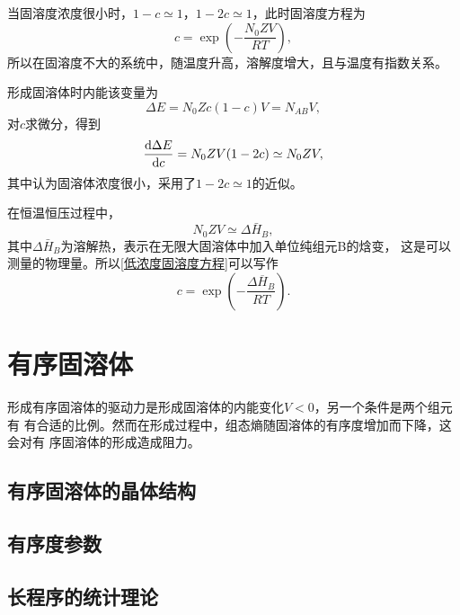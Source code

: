             当固溶度浓度很小时，$1-c\simeq 1$，$1-2c\simeq 1$，此时固溶度方程为
            \begin{equation}
                c=\exp \left(-\frac{N_{0} Z V}{R T}\right)\label{低浓度固溶度方程},
            \end{equation}
            所以在固溶度不大的系统中，随温度升高，溶解度增大，且与温度有指数关系。

            形成固溶体时内能该变量为
            \begin{equation}
                \Delta E=N_0Zc(1-c)V=N_{AB}V,
            \end{equation}
            对$c$求微分，得到
            \begin{equation}
                \frac{\mathop{}\!\mathrm{d} \Delta E}{\mathop{}\!\mathrm{d} c}=N_0ZV(1-2c)\simeq N_0ZV,
            \end{equation}
            其中认为固溶体浓度很小，采用了$1-2c\simeq 1$的近似。

            在恒温恒压过程中，
            \begin{equation}
                N_0ZV\simeq \Delta\bar{H}_B,
            \end{equation}
            其中$\Delta\bar{H}_B$为溶解热，表示在无限大固溶体中加入单位纯组元B的焓变，
            这是可以测量的物理量。所以\autoref{低浓度固溶度方程}可以写作
            \begin{equation}
                c=\exp \left(-\frac{\Delta \overline{H}_{B}}{R T}\right).
            \end{equation}

    \section{有序固溶体}
        形成有序固溶体的驱动力是形成固溶体的内能变化$V<0$，另一个条件是两个组元有
        有合适的比例。然而在形成过程中，组态熵随固溶体的有序度增加而下降，这会对有
        序固溶体的形成造成阻力。
        \subsection{有序固溶体的晶体结构}
        \subsection{有序度参数}
        \subsection{长程序的统计理论}
